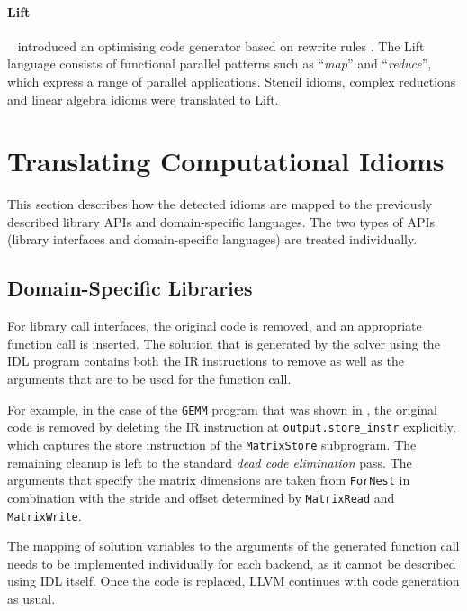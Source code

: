     \paragraph*{Lift}~\citet{steuwer15rewrite} introduced an optimising code
    generator based on rewrite rules \citep{SteuwerRD17, HagedornSSGD18}.
    The Lift language consists of functional parallel patterns such as
    ``\emph{map}'' and ``\emph{reduce}'', which  express a range of parallel
    applications.
    Stencil idioms, complex reductions and linear algebra idioms were translated
    to Lift.

\section{Translating Computational Idioms}

    This section describes how the detected idioms are mapped to the previously
    described library APIs and domain-specific languages.
    The two types of APIs (library interfaces and domain-specific languages) are
    treated individually.

\subsection{Domain-Specific Libraries}

    For library call interfaces, the original code is removed, and an
    appropriate function call is inserted.
    The solution that is generated by the solver using the IDL program contains
    both the IR instructions to remove as well as the arguments that are to be
    used for the function call.

    For example, in the case of the {\tt GEMM} program that was shown in
    , the original code is removed by deleting the IR
    instruction at {\tt output.store\_instr} explicitly, which captures the
    store instruction of the {\tt MatrixStore} subprogram.
    The remaining cleanup is left to the standard {\em dead code elimination}
    pass.
    The arguments that specify the matrix dimensions are taken from
    {\tt ForNest} in combination with the stride and offset determined by
    {\tt MatrixRead} and {\tt MatrixWrite}.

    The mapping of solution variables to the arguments of the generated function
    call needs to be implemented individually for each backend, as it cannot be
    described using IDL itself.
    Once the code is replaced, LLVM continues with code generation as usual.

